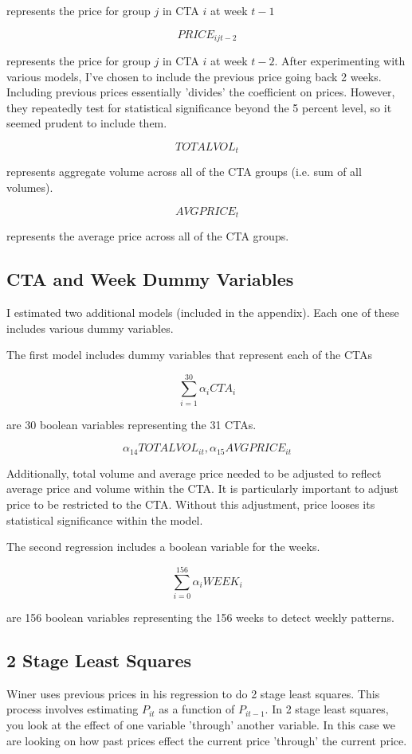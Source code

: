 \documentclass{article}
\begin{document}
 represents the price for group $j$ in CTA $i$ at week $t-1$

$${PRICE}_{ijt-2} $$ 

represents the price for group $j$ in CTA $i$ at week $t-2$. After experimenting with various models, I've chosen to include the previous price going back 2 weeks. Including previous prices essentially 'divides' the coefficient on prices. However, they repeatedly test for statistical significance beyond the 5 percent level, so it seemed prudent to include them.

$${TOTALVOL}_t $$ 

represents aggregate volume across all of the CTA groups (i.e. sum of all volumes).

$${AVGPRICE}_{t} $$ 

represents the average price across all of the CTA groups.

\subsection{CTA and Week Dummy Variables}

I estimated two additional models (included in the appendix). Each one of these includes various dummy variables.

The first model includes dummy variables that represent each of the CTAs

$$ \sum_{i=1}^{30} \alpha_i CTA_i $$

 are 30 boolean variables representing the 31 CTAs.

$$\alpha_{14}{TOTALVOL}_{it}, \alpha_{15} {AVGPRICE}_{it}$$

 Additionally, total volume and average price needed to be adjusted to reflect average price and volume within the CTA. It is particularly important to adjust price to be restricted to the CTA. Without this adjustment, price looses its statistical significance within the model.

The second regression includes a boolean variable for the weeks.

$$\sum_{i=0}^{156} \alpha_{i} WEEK_{i} $$ 

are 156 boolean variables representing the 156 weeks to detect weekly patterns.

\subsection{2 Stage Least Squares}

Winer uses previous prices in his regression to do 2 stage least squares. This process involves estimating ${P}_{it}$ as a function of ${P}_{it-1}$. In 2 stage least squares, you look at the effect of one variable 'through' another variable.  In this case we are looking on how past prices effect the current price 'through' the current price. 
\end{document}
